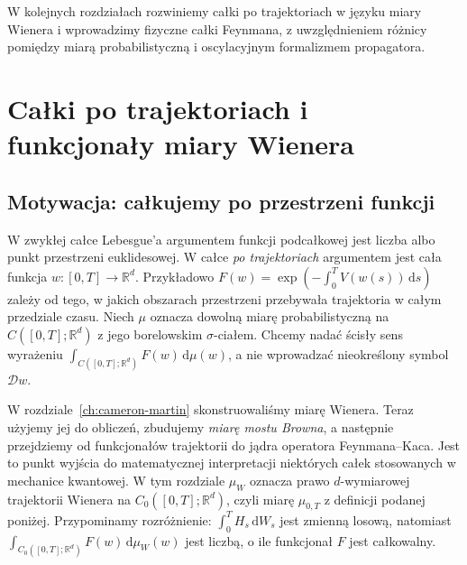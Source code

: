 \documentclass[11pt,a4paper,oneside]{report}
\numberwithin{equation}{chapter}
\theoremstyle{plain}
\theoremstyle{definition}
\theoremstyle{remark}
\newcommand{\R}{\mathbb{R}}
\newcommand{\dd}{\mathrm{d}}
\begin{document}
W kolejnych rozdziałach rozwiniemy całki po trajektoriach
w języku miary Wienera i wprowadzimy fizyczne całki
Feynmana, z uwzględnieniem różnicy pomiędzy miarą
probabilistyczną i oscylacyjnym formalizmem propagatora.




\chapter{Całki po trajektoriach i funkcjonały miary Wienera}
\label{chap:volIII:15}
\par\smallskip{}\par\smallskip

\label{ch:path-integrals}

\section{Motywacja: całkujemy po przestrzeni funkcji}\label{sec:volIII:15:01}

W zwykłej całce Lebesgue'a argumentem funkcji podcałkowej jest liczba
albo punkt przestrzeni euklidesowej. W całce \emph{po trajektoriach}
argumentem jest cała funkcja $w:[0,T]\to\R^d$. Przykładowo
$F(w)=\exp(-\int_0^T V(w(s))\,\dd s)$ zależy od tego, w jakich
obszarach przestrzeni przebywała trajektoria w całym przedziale czasu.
Niech $\mu$ oznacza dowolną miarę probabilistyczną
na $C([0,T];\R^d)$ z jego borelowskim $\sigma$-ciałem.
Chcemy nadać ścisły sens wyrażeniu
$\int_{C([0,T];\R^d)} F(w)\,\dd\mu(w)$, a nie
wprowadzać nieokreślony symbol $\mathcal D w$.

W rozdziale~\ref{ch:cameron-martin} skonstruowaliśmy miarę Wienera.
Teraz użyjemy jej do obliczeń, zbudujemy \emph{miarę mostu Browna},
a następnie przejdziemy od funkcjonałów trajektorii do jądra
operatora Feynmana--Kaca. Jest to punkt wyjścia do matematycznej
interpretacji niektórych całek stosowanych w mechanice kwantowej.
W tym rozdziale $\mu_W$ oznacza prawo $d$-wymiarowej
trajektorii Wienera na $C_0([0,T];\R^d)$, czyli
miarę $\mu_{0,T}$ z definicji podanej poniżej.
Przypominamy rozróżnienie: $\int_0^T H_s\,\dd W_s$ jest zmienną
losową, natomiast $\int_{C_0([0,T];\R^d)} F(w)\,\dd\mu_W(w)$ jest liczbą, o ile
funkcjonał $F$ jest całkowalny.
\end{document}
